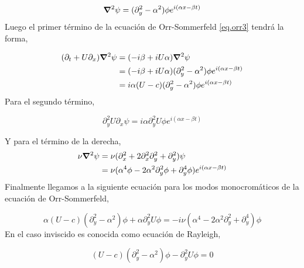 \documentclass[executivepaper,12pt]{article}
\numberwithin{equation}{section}
\begin{document}
\begin{equation*}
	\grad{}^2 \psi=(\partial_y ^2 -\alpha^2)\phi e^{i(\alpha x -\beta t)}
\end{equation*}
Luego el primer término de la ecuación de Orr-Sommerfeld \ref{eq.orr3} tendrá la forma,

\begin{align*}
	(\partial_t  +U\partial_x)\gradient^2 \psi &=(-i\beta+iU\alpha) \grad{}^2\psi\\
	&=(-i\beta+iU\alpha)(\partial_y ^2 -\alpha^2)\phi e^{i(\alpha x -\beta t)}\\
	&=i\alpha(U-c)(\partial_y ^2 -\alpha^2)\phi e^{i(\alpha x -\beta t)}
\end{align*}
Para el segundo término, 

\begin{equation*}
	\partial_y^2 U \partial_x \psi=i\alpha\partial_y^2 U \phi e^{i(\alpha x -\beta t)}
\end{equation*}

Y para el término de la derecha,
\begin{align*}
	\nu \grad{}^2\psi&=\nu(\partial_x^2 +2\partial_x^2\partial_y^2 +\partial_y^2 )\psi\\
	&=\nu(\alpha^4 \phi-2\alpha^2 \partial_y^2\phi+\partial_y^4\phi)e^{i(\alpha x -\beta t)}
\end{align*}
Finalmente llegamos a la siguiente ecuación para los modos monocromáticos de la ecuación de Orr-Sommerfeld, 

\begin{equation}
	\alpha(U-c)(\partial_y ^2 -\alpha^2)\phi+\alpha\partial_y^2 U \phi=-i \nu(\alpha^4 -2\alpha^2 \partial_y^2+\partial_y^4)\phi
	\label{eq.orr4}
\end{equation}
En el caso inviscido es conocida como ecuación de Rayleigh, 

\begin{equation}
(U-c)(\partial_y ^2 -\alpha^2)\phi-\partial_y^2 U \phi=0
\end{equation}


\pagebreak

\printbibliography
\end{document}
